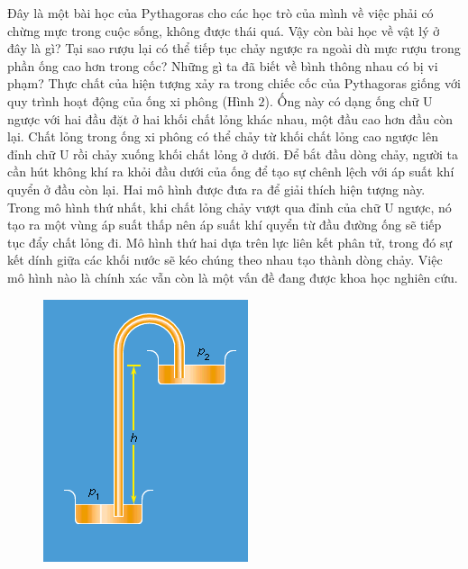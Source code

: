 \begin{multicols}{2}
	Đây là một bài học của Pythagoras cho các học trò của mình về việc phải có chừng mực trong cuộc sống, không được thái quá. Vậy còn bài học về vật lý ở đây là gì? Tại sao rượu lại có thể tiếp tục chảy ngược ra ngoài dù mực rượu trong phần ống cao hơn trong cốc? Những gì ta đã biết về bình thông nhau có bị vi phạm?
	\vskip 0.1cm
	Thực chất của hiện tượng xảy ra trong chiếc cốc của Pythagoras giống với quy trình hoạt động của ống xi phông (Hình $2$). Ống này có dạng ống chữ U ngược với hai đầu đặt ở hai khối chất lỏng khác nhau, một đầu cao hơn đầu còn lại. Chất lỏng trong ống xi phông có thể chảy từ khối chất lỏng cao ngược lên đỉnh chữ U rồi chảy xuống khối chất lỏng ở dưới. Để bắt đầu dòng chảy, người ta cần hút không khí ra khỏi đầu dưới của ống để tạo sự chênh lệch với áp suất khí quyển ở đầu còn lại. Hai mô hình được đưa ra để giải thích hiện tượng này. Trong mô hình thứ nhất, khi chất lỏng chảy vượt qua đỉnh của chữ U ngược, nó tạo ra một vùng áp suất thấp nên áp suất khí quyển từ đầu đường ống sẽ tiếp tục đẩy chất lỏng đi. Mô hình thứ hai dựa trên lực liên kết phân tử, trong đó sự kết dính giữa các khối nước sẽ kéo chúng theo nhau tạo thành dòng chảy. Việc mô hình nào là chính xác vẫn còn là một vấn đề đang được khoa học nghiên cứu.
	\begin{figure}[H]
		\vspace*{-5pt}
		\centering
		\captionsetup{labelformat= empty, justification=centering}
		\includegraphics[width= 1\linewidth]{2}

\end{figure}
\end{multicols}
